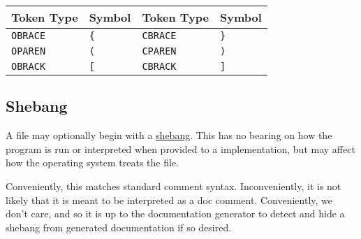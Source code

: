 \begin{table}[H]
    \centering
    \begin{tabular}[t]{|ll|ll|}
        \hline
        \textbf{Token Type} & \textbf{Symbol}& \textbf{Token Type} & \textbf{Symbol} \\
        \hline
        \texttt{OBRACE} & \texttt{\{}& \texttt{CBRACE} & \texttt{\}} \\
        \texttt{OPAREN} & \texttt{(} & \texttt{CPAREN} & \texttt{)} \\
        \texttt{OBRACK} & \texttt{[} & \texttt{CBRACK} & \texttt{]} \\
        \hline
    \end{tabular}
\end{table}

\subsection{Shebang}

A \Trilogy{} file may optionally begin with a
\href{https://en.wikipedia.org/wiki/Shebang_(Unix)}{shebang}. This has no bearing
on how the program is run or interpreted when provided to a \Trilogy{} implementation,
but may affect how the operating system treats the file.

Conveniently, this matches standard comment syntax. Inconveniently, it is not
likely that it is meant to be interpreted as a doc comment. Conveniently,
we don't care, and so it is up to the documentation generator to detect and
hide a shebang from generated documentation if so desired.
